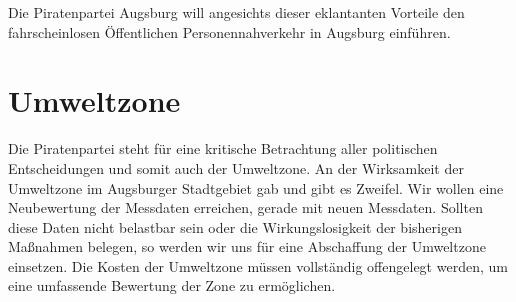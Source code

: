   Die Piratenpartei Augsburg will angesichts dieser eklantanten Vorteile den 
  fahrscheinlosen Öffentlichen Personennahverkehr in Augsburg einführen.
  
  \section{Umweltzone}
  
  Die Piratenpartei steht für eine kritische Betrachtung aller politischen 
  Entscheidungen und somit auch der Umweltzone. An der Wirksamkeit der 
  Umweltzone im Augsburger Stadtgebiet gab und gibt es Zweifel. Wir wollen 
  eine Neubewertung der Messdaten erreichen, gerade mit neuen Messdaten. 
  Sollten diese Daten nicht belastbar sein oder die Wirkungslosigkeit der 
  bisherigen Maßnahmen belegen, so werden wir uns für eine Abschaffung der 
  Umweltzone einsetzen. Die Kosten der Umweltzone müssen vollständig 
  offengelegt werden, um eine umfassende Bewertung der Zone zu ermöglichen.